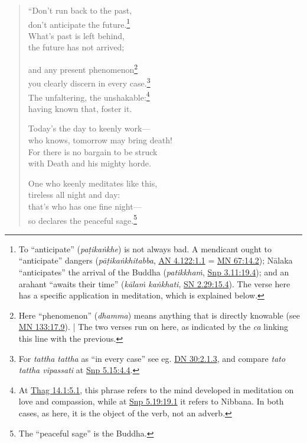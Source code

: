 \documentclass[12pt,openany]{book}%
\begin{document}
\begin{verse}%
“Don’t run back to the past, \\
don’t anticipate the future.\footnote{To “anticipate” (\textit{\textsanskrit{paṭikaṅkhe}}) is not always bad. A mendicant ought to “anticipate” dangers (\textit{\textsanskrit{pāṭikaṅkhitabba}}, \href{https://suttacentral.net/an4.122/en/sujato\#1.1}{AN 4.122:1.1} = \href{https://suttacentral.net/mn67/en/sujato\#14.2}{MN 67:14.2}); \textsanskrit{Nālaka} “anticipates” the arrival of the Buddha (\textit{\textsanskrit{patikkhaṁ}}, \href{https://suttacentral.net/snp3.11/en/sujato\#19.4}{Snp 3.11:19.4}); and an arahant “awaits their time” (\textit{\textsanskrit{kālaṁ} \textsanskrit{kaṅkhati}}, \href{https://suttacentral.net/sn2.29/en/sujato\#15.4}{SN 2.29:15.4}). The verse here has a specific application in meditation, which is explained below. } \\
What’s past is left behind, \\
the future has not arrived; 

and any present phenomenon\footnote{Here “phenomenon” (\textit{dhamma}) means anything that is directly knowable (see \href{https://suttacentral.net/mn133/en/sujato\#17.9}{MN 133:17.9}). | The two verses run on here, as indicated by the \textit{ca} linking this line with the previous. } \\
you clearly discern in every case.\footnote{For \textit{tattha tattha} as “in every case” see eg. \href{https://suttacentral.net/dn30/en/sujato\#2.1.3}{DN 30:2.1.3}, and compare \textit{tato tattha vipassati} at \href{https://suttacentral.net/snp5.15/en/sujato\#4.4}{Snp 5.15:4.4}. } \\
The unfaltering, the unshakable:\footnote{At \href{https://suttacentral.net/thag14.1/en/sujato\#5.1}{Thag 14.1:5.1}, this phrase refers to the mind developed in meditation on love and compassion, while at \href{https://suttacentral.net/snp5.19/en/sujato\#19.1}{Snp 5.19:19.1} it refers to Nibbana. In both cases, as here, it is the object of the verb, not an adverb. } \\
having known that, foster it. 

Today’s the day to keenly work—\\
who knows, tomorrow may bring death! \\
For there is no bargain to be struck \\
with Death and his mighty horde. 

One who keenly meditates like this, \\
tireless all night and day: \\
that’s who has one fine night—\\
so declares the peaceful sage.\footnote{The “peaceful sage” is the Buddha. } 

%
\end{verse}
\end{document}
